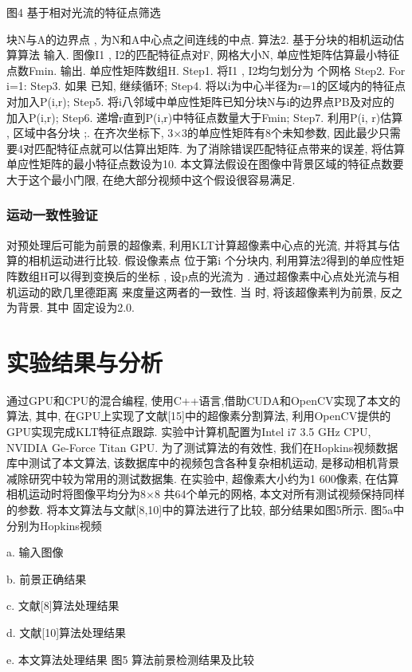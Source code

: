 图4  基于相对光流的特征点筛选

块N与A的边界点 ,  为N和A中心点之间连线的中点.
算法2. 基于分块的相机运动估算算法
输入. 图像I1 , I2的匹配特征点对F, 网格大小N, 单应性矩阵估算最小特征点数Fmin.
输出. 单应性矩阵数组H.
Step1. 将I1 , I2均匀划分为 个网格
Step2. For i=1: {
Step3. 如果 已知, 继续循环;
Step4. 将以i为中心半径为r=1的区域内的特征点对加入P(i,r);
Step5. 将i八邻域中单应性矩阵已知分块N与i的边界点PB及对应的 加入P(i,r);
Step6. 递增r直到P(i,r)中特征点数量大于Fmin;
Step7. 利用P(i, r)估算 , 区域中各分块 ;}.
在齐次坐标下, 3×3的单应性矩阵有8个未知参数, 因此最少只需要4对匹配特征点就可以估算出矩阵. 为了消除错误匹配特征点带来的误差, 将估算单应性矩阵的最小特征点数设为10. 本文算法假设在图像中背景区域的特征点数要大于这个最小门限, 在绝大部分视频中这个假设很容易满足.


\subsubsection{运动一致性验证}
\label{ch5:sec:sub:sub:motionC}

 对预处理后可能为前景的超像素, 利用KLT计算超像素中心点的光流, 并将其与估算的相机运动进行比较. 假设像素点 位于第i 个分块内, 利用算法2得到的单应性矩阵数组H可以得到变换后的坐标 , 设p点的光流为 . 通过超像素中心点处光流与相机运动的欧几里德距离  来度量这两者的一致性. 当 时, 将该超像素判为前景, 反之为背景. 其中 固定设为2.0.
\section{实验结果与分析}
\label{ch5:sec:results}
 通过GPU和CPU的混合编程, 使用C++语言,借助CUDA和OpenCV实现了本文的算法, 其中, 在GPU上实现了文献[15]中的超像素分割算法, 利用OpenCV提供的GPU实现完成KLT特征点跟踪. 实验中计算机配置为Intel i7 3.5 GHz CPU, NVIDIA Ge-Force Titan GPU. 为了测试算法的有效性, 我们在Hopkins视频数据库中测试了本文算法, 该数据库中的视频包含各种复杂相机运动, 是移动相机背景减除研究中较为常用的测试数据集. 在实验中, 超像素大小约为1 600像素, 在估算相机运动时将图像平均分为8×8 共64个单元的网格, 本文对所有测试视频保持同样的参数.
将本文算法与文献[8,10]中的算法进行了比较, 部分结果如图5所示. 图5a中分别为Hopkins视频



a. 输入图像

b. 前景正确结果

c. 文献[8]算法处理结果

d. 文献[10]算法处理结果

e. 本文算法处理结果
图5  算法前景检测结果及比较


